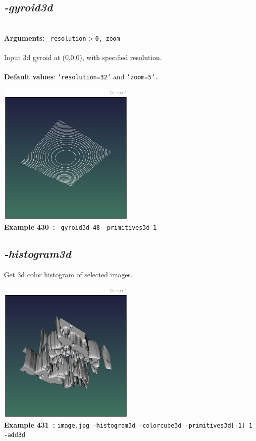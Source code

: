 \documentclass[a4paper,11pt,twoside]{book}
\begin{document}
\subsection{\emph{-gyroid3d} }\vspace*{-0.5em}
~\\\textbf{Arguments: } 
{\small \texttt{\_resolution$>$0,\_zoom}}\\~\\
Input 3d gyroid at (0,0,0), with specified resolution.
~\\~\\\textbf{Default values}: {\small \texttt{'resolution=32'} and \texttt{'zoom=5'.}}
\begin{center}\includegraphics[keepaspectratio=true,height=7cm,width=\textwidth]{img/gmic_def430.jpg}\\
{\footnotesize \textbf{Example 430~:} \texttt{-gyroid3d 48 --primitives3d 1}}
\end{center}

\subsection{\emph{-histogram3d} }\vspace*{-0.5em}
Get 3d color histogram of selected images.
\begin{center}\includegraphics[keepaspectratio=true,height=7cm,width=\textwidth]{img/gmic_def431.jpg}\\
{\footnotesize \textbf{Example 431~:} \texttt{image.jpg -histogram3d -colorcube3d -primitives3d[-1] 1 -add3d}}
\end{center}
\end{document}
